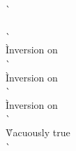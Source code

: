\begin{description}
\begin{tabbing}
   \\
    \`  \\
  \\
    \`  \\
    \` Inversion on  \\
    \`  \\
    \` Inversion on  \\
    \`  \\
    \` Inversion on  \\
    \`  \\
    \` Vacuously true \\
    \`  \\
  \end{tabbing}

\item[\rulesteppushcallargs] \ \\


\end{description}
